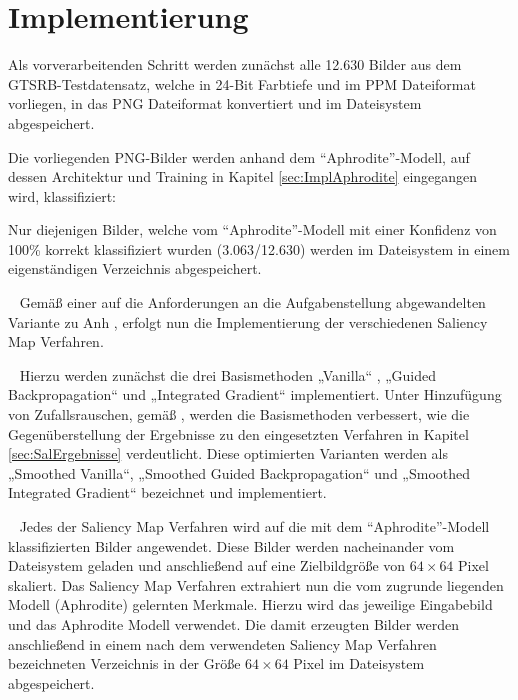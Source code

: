 \section{Implementierung}

Als vorverarbeitenden Schritt werden zunächst alle 12.630 Bilder aus dem GTSRB-Testdatensatz, welche in 24-Bit Farbtiefe und im \ac{PPM} Dateiformat vorliegen, in das \ac{PNG} Dateiformat konvertiert und im Dateisystem abgespeichert.


Die vorliegenden PNG-Bilder werden anhand dem "`Aphrodite"'-Modell, auf dessen Architektur und Training in Kapitel \ref{sec:ImplAphrodite} eingegangen wird, klassifiziert: 

Nur diejenigen Bilder, welche vom "`Aphrodite"'-Modell mit einer Konfidenz von 100\% korrekt klassifiziert wurden (3.063/12.630) werden im Dateisystem in einem eigenständigen Verzeichnis abgespeichert.

~\newline
Gemäß einer auf die Anforderungen an die Aufgabenstellung abgewandelten Variante zu Anh \cite{anh_implementations_2019}, erfolgt nun die Implementierung der verschiedenen Saliency Map Verfahren.

~\newline
Hierzu werden zunächst die drei Basismethoden „Vanilla“ \cite{simonyan_deep_2013}, „Guided Backpropagation“ \cite{springenberg_striving_2014} und „Integrated Gradient“ \cite{sundararajan_axiomatic_2017} implementiert. 
Unter Hinzufügung von Zufallsrauschen, gemäß \cite{smilkov_smoothgrad:_2017}, werden die Basismethoden verbessert, wie die Gegenüberstellung der Ergebnisse zu den eingesetzten Verfahren in Kapitel \ref{sec:SalErgebnisse} verdeutlicht.
Diese optimierten Varianten werden als „Smoothed Vanilla“, „Smoothed Guided Backpropagation“ und „Smoothed Integrated Gradient“ bezeichnet und implementiert.

~\newline
Jedes der Saliency Map Verfahren wird auf die mit dem "`Aphrodite"'-Modell klassifizierten Bilder angewendet. Diese Bilder werden nacheinander vom Dateisystem geladen und anschließend auf eine Zielbildgröße von $64 \times 64 $ Pixel skaliert. 
Das Saliency Map Verfahren extrahiert nun die vom zugrunde liegenden Modell (Aphrodite) gelernten Merkmale. Hierzu wird das jeweilige Eingabebild und das Aphrodite Modell verwendet. 
Die damit erzeugten Bilder werden anschließend in einem nach dem verwendeten Saliency Map Verfahren bezeichneten Verzeichnis in der Größe $64 \times 64 $ Pixel im Dateisystem abgespeichert.

